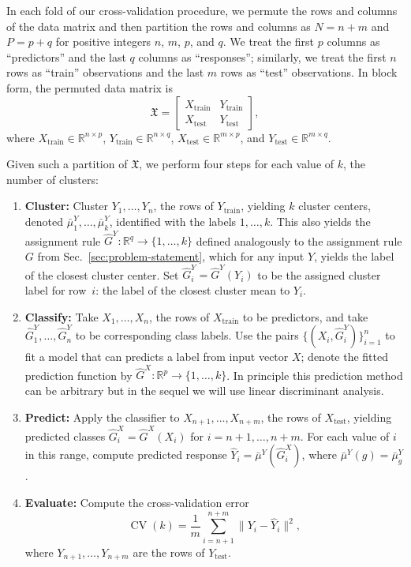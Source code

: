 \documentclass[12pt]{article}
\newcommand{\CV}{\operatorname{CV}}
\newcommand{\R}{\mathbb{R}}
\newcommand{\bmuY}{\bar \mu^{Y}}
\newcommand{\dataX}{\mathfrak{X}}
\newcommand{\Xtrain}{X_{\text{train}}}
\newcommand{\Ytrain}{Y_{\text{train}}}
\newcommand{\Xtest}{X_{\text{test}}}
\newcommand{\Ytest}{Y_{\text{test}}}
\newcommand{\hGX}{\hat G^{X}}
\newcommand{\hGY}{\hat G^{Y}}
\begin{document}
In each fold of our cross-validation procedure, we permute the rows and
columns of the data matrix and then partition the rows and columns as $N = n +
m$ and $P = p + q$ for positive integers $n$, $m$, $p$, and $q$.  We treat
the first $p$ columns as ``predictors'' and the last $q$ columns as
``responses''; similarly, we treat the first $n$ rows as ``train''
observations and the last $m$ rows as ``test'' observations.  In block form,
the permuted data matrix is
\[
  \dataX
  =
  \begin{bmatrix}
    \Xtrain & \Ytrain \\
    \Xtest  & \Ytest
  \end{bmatrix},
\]
where
$\Xtrain \in \R^{n \times p}$,
$\Ytrain \in \R^{n \times q}$,
$\Xtest \in  \R^{m \times p}$,
and
$\Ytest \in  \R^{m \times q}$.


Given such a partition of $\dataX$, we perform four steps for each value of
$k$, the number of clusters:
\begin{enumerate}
  \item \label{step:gabriel-cluster}
    \textbf{Cluster:}
    Cluster $Y_{1}, \dotsc, Y_n$, the rows of $\Ytrain$, yielding
    $k$ cluster centers, denoted $\bmuY_1, \dotsc, \bmuY_k$, identified
    with the labels $1, \dotsc, k$. This also yields the
    assignment rule $\hGY : \R^q \to \{ 1, \dotsc, k \}$ defined analogously
    to the assignment rule $G$ from Sec.~\ref{sec:problem-statement}, which
    for any input $Y$, yields the label of the closest cluster center.
    Set $\hGY_i = \hGY(Y_i)$ to be the assigned cluster label for row~$i$: the
    label of the closest cluster mean to $Y_i$.
  \item \label{step:gabriel-classify}
    \textbf{Classify:}
    Take $X_{1}, \dotsc, X_n$, the rows of $\Xtrain$ to be predictors,
    and take $\hGY_1, \dotsc, \hGY_n$ to be corresponding class labels.  Use
    the pairs $\{ (X_i, \hGY_i) \}_{i=1}^{n}$ to fit a model that can
    predicts a label from input vector $X$; denote the fitted
    prediction function by
    $\hGX : \R^p \to \{ 1, \dotsc, k \}$. In principle this prediction method
    can be arbitrary but in the sequel we will use linear discriminant
    analysis.
  \item \label{step:gabriel-predict}
    \textbf{Predict:}
    Apply the classifier to $X_{n+1}, \dotsc, X_{n+m}$, the rows of
    $\Xtest$, yielding predicted classes $\hGX_i = \hGX(X_i)$ for
    $i = n+1, \dotsc, n+m$.  For each value of $i$ in this range, compute
    predicted response $\hat Y_i = \bmuY(\hGX_i)$, where
    $\bmuY(g) = \bmuY_g$.
  \item \label{step:gabriel-evaluate}
    \textbf{Evaluate:}
    Compute the cross-validation error
    \[
      \CV(k) = \frac{1}{m} \sum_{i=n+1}^{n+m} \|Y_i - \hat Y_i\|^2,
    \]
    where $Y_{n+1}, \dotsc, Y_{n+m}$ are the rows of $\Ytest$.
\end{enumerate}
\end{document}
